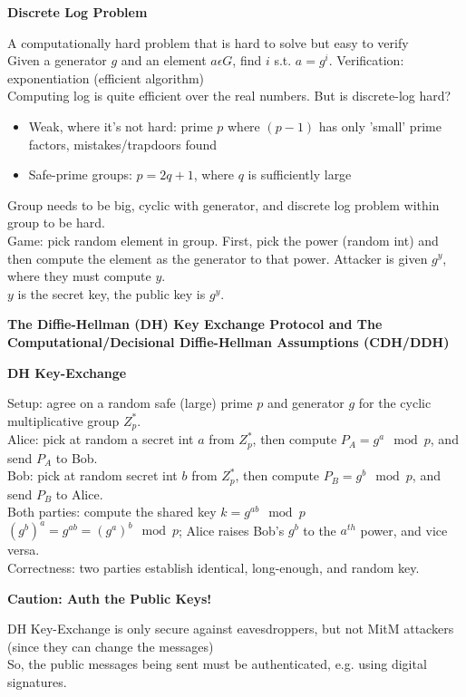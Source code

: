 \documentclass{article}
\begin{document}
\textbf{Discrete Log Problem}

A computationally hard problem that is hard to solve but easy to verify\\
Given a generator $g$ and an element $a\epsilon G$, find $i$ s.t. $a=g^i$. Verification: exponentiation (efficient algorithm)\\
Computing log is quite efficient over the real numbers. But is discrete-log hard?\begin{itemize}
	\item Weak, where it's not hard: prime $p$ where $(p-1)$ has only 'small' prime factors, mistakes/trapdoors found
	\item Safe-prime groups: $p=2q+1$, where $q$ is sufficiently large
\end{itemize}
Group needs to be big, cyclic with generator, and discrete log problem within group to be hard.\\
Game: pick random element in group. First, pick the power (random int) and then compute the element as the generator to that power. Attacker is given $g^y$, where they must compute $y$.\\
$y$ is the secret key, the public key is $g^y$.

\textbf{The Diffie-Hellman (DH) Key Exchange Protocol and The Computational/Decisional Diffie-Hellman Assumptions (CDH/DDH)}

\textbf{DH Key-Exchange}

Setup: agree on a random safe (large) prime $p$ and generator $g$ for the cyclic multiplicative group $Z_p^*$.\\
Alice: pick at random a secret int $a$ from $Z_p^*$, then compute $P_A=g^a\mod p$, and send $P_A$ to Bob.\\
Bob: pick at random secret int $b$ from $Z_p^*$, then compute $P_B=g^b\mod p$, and send $P_B$ to Alice.\\
Both parties: compute the shared key $k=g^{ab}\mod p$\\
$(g^b)^a=g^{ab}=(g^a)^b\mod p$; Alice raises Bob's $g^b$ to the $a^{th}$ power, and vice versa.\\
Correctness: two parties establish identical, long-enough, and random key.

\textbf{Caution: Auth the Public Keys!}

DH Key-Exchange is only secure against eavesdroppers, but not MitM attackers (since they can change the messages)\\
So, the public messages being sent must be authenticated, e.g. using digital signatures.
\end{document}
